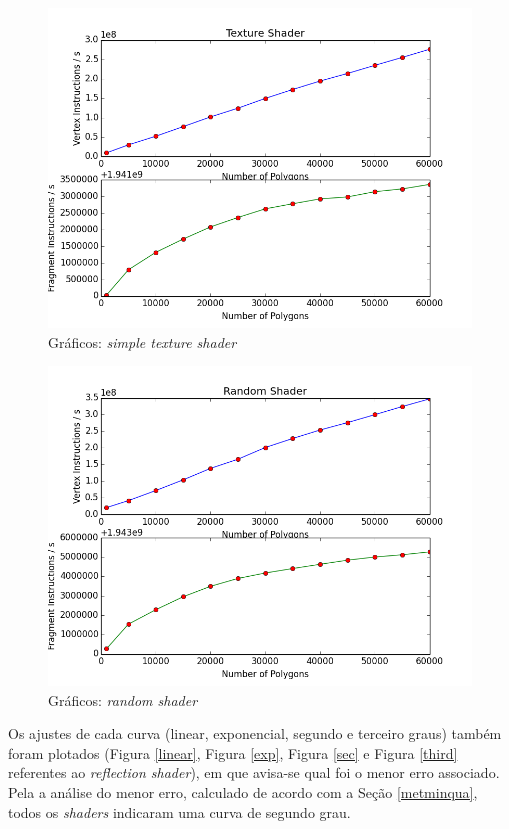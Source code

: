 	\begin{figure}[h]
	\centering
		\includegraphics[keepaspectratio=true,scale=0.6]{figuras/texplot.png}
	\caption{Gráficos: \textit{simple texture shader}}
	\label{plottex}
	\end{figure}

	\begin{figure}[h]
	\centering
		\includegraphics[keepaspectratio=true,scale=0.6]{figuras/randomplot.png}
	\caption{Gráficos: \textit{random shader}}
	\label{plotcolor}
	\end{figure}

	 Os ajustes de cada curva (linear, exponencial, segundo e terceiro graus) também foram plotados (Figura \ref{linear}, Figura \ref{exp}, Figura \ref{sec} e Figura \ref{third} referentes ao \textit{reflection shader}), em que avisa-se qual foi o menor erro associado. Pela a análise do menor erro, calculado de acordo com a Seção \ref{metminqua}, todos os \textit{shaders} indicaram uma curva de segundo grau.

